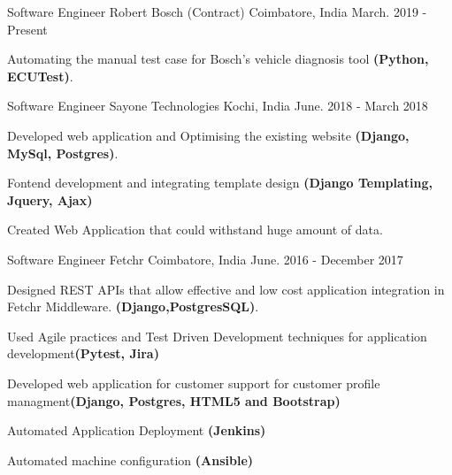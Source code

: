 

\begin{cventries}

  \cventry
    {Software Engineer} %
    {Robert Bosch (Contract)} %
    {Coimbatore, India} %
    {March. 2019 - Present} %
    {
      \begin{cvitems} %
        \item {Automating the manual test case for Bosch's vehicle diagnosis tool
\textbf{(Python, ECUTest)}.}
      \end{cvitems}
    }
  
  \cventry
    {Software Engineer} %
    {Sayone Technologies} %
    {Kochi, India} %
    {June. 2018 - March 2018} %
    {
      \begin{cvitems} %
        \item {Developed web application and Optimising the existing website
\textbf{(Django, MySql, Postgres)}.}
        \item {Fontend development and integrating template design \textbf{(Django Templating, Jquery, Ajax)}}
        \item {Created Web Application that could withstand huge amount of data.}
      \end{cvitems}
    }
 
  \cventry
    {Software Engineer} %
    {Fetchr} %
    {Coimbatore, India} %
    {June. 2016 - December 2017} %
    {
      \begin{cvitems} %
        \item {Designed REST APIs that allow effective and low cost application integration in Fetchr Middleware.
\textbf{(Django,PostgresSQL)}.}
        \item {Used Agile practices and Test Driven Development techniques for application development\textbf{(Pytest, Jira)}}
        \item {Developed web application for customer support for customer profile managment\textbf{(Django, Postgres, HTML5 and Bootstrap)}}
        \item {Automated Application Deployment \textbf{(Jenkins)}}
        \item {Automated machine configuration \textbf{(Ansible)}}
      \end{cvitems}
    }

\end{cventries}
